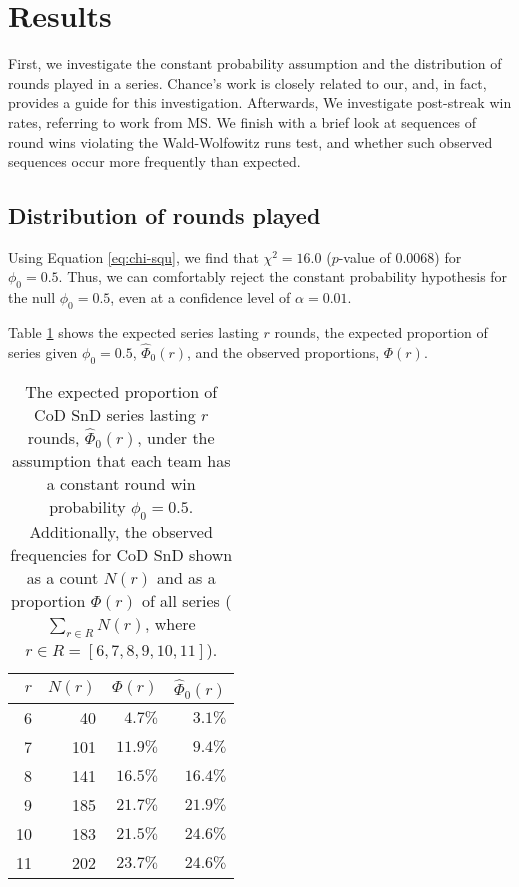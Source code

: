 \documentclass{article}
\begin{document}
\hypertarget{results}{%
\section{Results}\label{results}}

First, we investigate the constant probability assumption and the
distribution of rounds played in a series. Chance's work is closely
related to our, and, in fact, provides a guide for this investigation.
Afterwards, We investigate post-streak win rates, referring to work from
MS. We finish with a brief look at sequences of round wins violating the
Wald-Wolfowitz runs test, and whether such observed sequences occur more
frequently than expected.

\hypertarget{distribution-of-rounds-played-1}{%
\subsection{Distribution of rounds
played}\label{distribution-of-rounds-played-1}}

Using Equation \ref{eq:chi-squ}, we find that \(\chi^2 = 16.0\)
(\(p\)-value of 0.0068) for \(\phi_0 = 0.5\). Thus, we can comfortably
reject the constant probability hypothesis for the null
\(\phi_0 = 0.5\), even at a confidence level of \(\alpha = 0.01\).

Table \ref{tbl:prob-series-lasts-r-rounds} shows the expected series
lasting \(r\) rounds, the expected proportion of series given
\(\phi_0 = 0.5\), \(\hat{\Phi}_0(r)\), and the observed proportions,
\(\Phi(r)\).

\begin{table}
\caption{The expected proportion of CoD SnD series lasting $r$ rounds, $\hat{\Phi}_0(r)$, under the assumption that each team has a constant round win probability $\phi_0 = 0.5$. Additionally, the observed frequencies for CoD SnD shown as a count $N(r)$ and as a proportion $\Phi(r)$ of all series ($\sum_{r \in R} N(r)$, where $r \in R = [6, 7, 8, 9, 10, 11]$).}

\centering
\begin{tabular}{rrrr}
\toprule
$r$ & $N(r)$ & $\Phi(r)$ & $\hat{\Phi}_0(r)$ \\ 
\midrule

6 & 40 & $4.7\%$ & $3.1\%$ \\ 
7 & 101 & $11.9\%$ & $9.4\%$ \\ 
8 & 141 & $16.5\%$ & $16.4\%$ \\ 
9 & 185 & $21.7\%$ & $21.9\%$ \\ 
10 & 183 & $21.5\%$ & $24.6\%$ \\ 
11 & 202 & $23.7\%$ & $24.6\%$ \\ 

\bottomrule
\end{tabular}

\label{tbl:prob-series-lasts-r-rounds}

\end{table}
\end{document}
